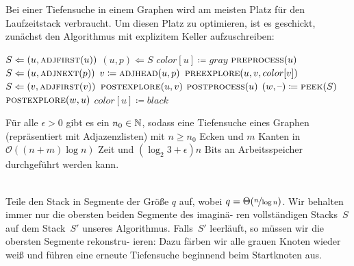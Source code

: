 \documentclass{cheat-sheet}
\renewcommand{\O}{\mathcal{O}} %
\newcommand{\Push}{\Leftarrow} %
\newcommand{\Pop}{\Leftarrow} %
\begin{document}

\begin{alg}
  Bei einer Tiefensuche in einem Graphen wird am meisten Platz für den Laufzeitstack verbraucht. Um diesen Platz zu optimieren, ist es geschickt, zunächst den Algorithmus mit explizitem Keller aufzuschreiben:
  \begin{algorithmic}[1]
      \State $S \Push (u, \Call{adjfirst}{u})$
        \State $(u, p) \Pop S$
          \State $color[u] \coloneqq gray$
          \State $\Call{preprocess}{u}$
        \EndIf
          \State $S \Push (u, \Call{adjnext}{p})$
          \State $v \coloneqq \Call{adjhead}{u, p}$
          \State $\Call{preexplore}{u, v, color[v]}$
            \State $S \Push (v, \Call{adjfirst}{v})$
          \Else
            \State $\Call{postexplore}{u, v}$
          \EndIf
        \Else
          \State $\Call{postprocess}{u}$
            \State $(w, \blank) \coloneqq \Call{peek}{S}$
            \State $\Call{postexplore}{w, u}$
          \EndIf
          \State $color[u] \coloneqq black$
        \EndIf
      \EndWhile
    \EndFunction
  \end{algorithmic}
\end{alg}


\begin{thm}
  Für alle $\epsilon > 0$ gibt es ein $n_0 \in \mathbb{N}$, sodass eine Tiefensuche eines Graphen (repräsentiert mit Adjazenzlisten) mit $n \geq n_0$ Ecken und $m$ Kanten in $\O((n+m) \log n)$ Zeit und $(\log_2 3 + \epsilon) n$ Bits an Arbeitsspeicher durchgeführt werden kann.
\end{thm}

\begin{alg} \mbox{}\\
  Teile den Stack in Segmente der Größe $q$ auf, wobei $q = \Theta(\nicefrac{n}{\log n})$.
  Wir behalten immer nur die obersten beiden Segmente des imaginä- ren vollständigen Stacks~$S$ auf dem Stack~$S'$ unseres Algorithmus.
  Falls~$S'$ leerläuft, so müssen wir die obersten Segmente rekonstru- ieren: Dazu färben wir alle grauen Knoten wieder weiß und führen eine erneute Tiefensuche beginnend beim Startknoten aus.
\end{alg}
\end{document}

